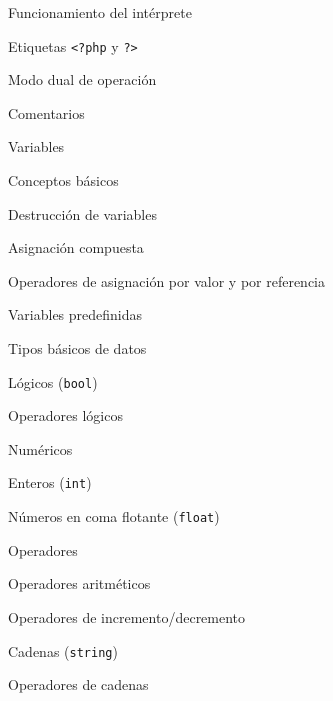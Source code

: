 \begin{longenum}
\begin{longenum}
\begin{longenum}
        \end{longenum}
        \item Funcionamiento del intérprete
        \begin{longenum}
            \item Etiquetas \texttt{<?php} y \texttt{?>}
            \item Modo dual de operación
            \item Comentarios
        \end{longenum}
        \item Variables
        \begin{longenum}
            \item Conceptos básicos
            \item Destrucción de variables
            \item Asignación compuesta
            \item Operadores de asignación por valor y por referencia
            \item Variables predefinidas
        \end{longenum}
        \item Tipos básicos de datos
        \begin{longenum}
            \item Lógicos (\texttt{bool})
            \begin{longenum}
                \item Operadores lógicos
            \end{longenum}
            \item Numéricos
            \begin{longenum}
                \item Enteros (\texttt{int})
                \item Números en coma flotante (\texttt{float})
                \item Operadores
                \begin{longenum}
                    \item Operadores aritméticos
                    \item Operadores de incremento/decremento
                \end{longenum}
            \end{longenum}
            \item Cadenas (\texttt{string})
            \begin{longenum}
                \item Operadores de cadenas

\end{longenum}
\end{longenum}
\end{longenum}
\end{longenum}

